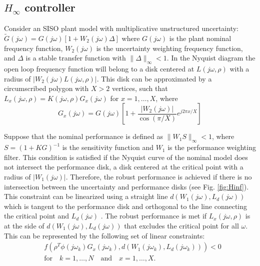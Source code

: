 \documentclass [12pt , a4paper] {article}
\begin{document}
\subsection{$H_\infty$ controller}
Consider an SISO plant model with multiplicative unstructured uncertainty: $\tilde{G}(j\omega)=G(j\omega)[1+W_2(j\omega)\Delta]$ where $G(j\omega)$ is the plant nominal frequency function, $W_2(j\omega)$ is the uncertainty weighting frequency function, and $\Delta$ is a stable transfer function with $\|\Delta\|_\infty < 1$. In the Nyquist diagram the open loop frequency function will belong to a disk centered at $L(j\omega,\rho)$ with a radius of $|W_2(j\omega)L(j\omega,\rho)|$. This disk can be approximated by a circumscribed polygon with $X > 2$ vertices, such that $L_x(j\omega,\rho)=K(j\omega,\rho)G_x(j\omega)$ for $x=1,\ldots,X$, where
\begin{equation}
G_x(j\omega)=G(j\omega)\left[ 1+\frac{|W_2(j\omega)|}{\cos{(\pi/X)}} e^{j2\pi x/X} \right]
\end{equation}

Suppose that the nominal performance is defined as $\|W_1S\|_\infty<1$, where $S=(1+KG)^{-1}$ is the sensitivity function and $W_1$ is the performance weighting filter. This condition is satisfied if the Nyquist curve of the nominal model does not intersect the performance disk, a disk centered at the critical point with a radius of $|W_1(j\omega)|$. Therefore, the robust performance is achieved if there is no intersection between the uncertainty and performance disks \cite{DFT92} (see Fig. \ref{fig:Hinf}). This constraint can be linearized using a straight line $d(W_1(j\omega),L_d(j\omega))$ which is tangent to the performance disk and orthogonal to the line connecting the critical point and $L_d(j\omega)$ \cite{KG10}. The robust performance is met if $L_x(j\omega,\rho)$ is at the side of $d(W_1(j\omega),L_d(j\omega))$ that excludes the critical point for all $\omega$. This can be represented by the following set of linear constraints:
\begin{align}
\label{eq:rbstper}
& f(\rho^T \phi(j\omega_{k})G_x(j\omega_{k}),d(W_1(j\omega_k),L_d(j\omega_k)))<0 \\ 
& \mbox{for} \quad k=1,\ldots,N \quad \mbox{and} \quad x=1,\ldots,X. \nonumber
\end{align}
 
\end{document}
